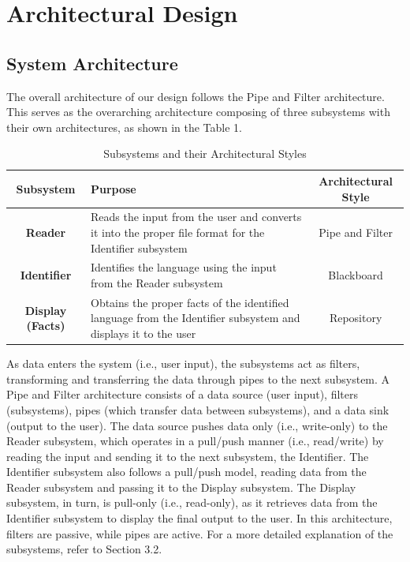 \section{Architectural Design }
\label{sec:architectural_design}

\subsection{System Architecture}
\label{sub:system_architecture}
The overall architecture of our design follows the Pipe and Filter architecture. This serves as the overarching architecture composing of three subsystems with their own architectures, as shown in the Table 1.

\begin{table}[h]
    \centering
    \renewcommand{\arraystretch}{1.5}
    \begin{tabular}{|c|p{8cm}|c|}
        \hline
        \textbf{Subsystem} & \textbf{Purpose} & \textbf{Architectural Style} \\
        \hline
        \textbf{Reader} & Reads the input from the user and converts it into the proper file format for the Identifier subsystem & Pipe and Filter \\
        \hline
        \textbf{Identifier} & Identifies the language using the input from the Reader subsystem & Blackboard \\
        \hline
        \textbf{Display (Facts)} & Obtains the proper facts of the identified language from the Identifier subsystem and displays it to the user & Repository \\
        \hline
    \end{tabular}
    \caption{Subsystems and their Architectural Styles}
    \label{tab:subsystems}
\end{table}

\noindent
As data enters the system (i.e., user input), the subsystems act as filters, transforming and transferring the data through pipes to the next subsystem. A Pipe and Filter architecture consists of a data source (user input), filters (subsystems), pipes (which transfer data between subsystems), and a data sink (output to the user). The data source pushes data only (i.e., write-only) to the Reader subsystem, which operates in a pull/push manner (i.e., read/write) by reading the input and sending it to the next subsystem, the Identifier. The Identifier subsystem also follows a pull/push model, reading data from the Reader subsystem and passing it to the Display subsystem. The Display subsystem, in turn, is pull-only (i.e., read-only), as it retrieves data from the Identifier subsystem to display the final output to the user. In this architecture, filters are passive, while pipes are active. For a more detailed explanation of the subsystems, refer to Section 3.2. \\

